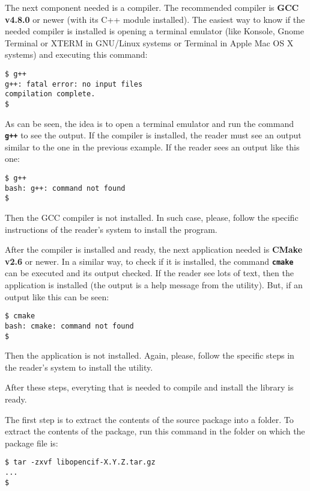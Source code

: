 \documentclass[11pt,twoside,openany,x11names,svgnames]{memoir}
\begin{document}
The next component needed is a compiler. The recommended compiler is \textbf{GCC v4.8.0} or newer (with its C++ module installed). The easiest way to know if the needed compiler is installed is opening a terminal emulator (like Konsole, Gnome Terminal or XTERM in GNU/Linux systems or Terminal in Apple Mac OS X systems) and executing this command:

\begin{lstlisting}[frame=single,style=SystemCommandStyle]
$ g++
g++: fatal error: no input files
compilation complete.
$
\end{lstlisting}

As can be seen, the idea is to open a terminal emulator and run the command \textbf{\texttt{g++}} to see the output. If the compiler is installed, the reader must see an output similar to the one in the previous example. If the reader sees an output like this one:

\begin{lstlisting}[frame=single,style=SystemCommandStyle]
$ g++
bash: g++: command not found
$
\end{lstlisting}

Then the GCC compiler is not installed. In such case, please, follow the specific instructions of the reader's system to install the program.

After the compiler is installed and ready, the next application needed is \textbf{CMake v2.6} or newer. In a similar way, to check if it is installed, the command \textbf{\texttt{cmake}} can be executed and its output checked. If the reader see lots of text, then the application is installed (the output is a help message from the utility). But, if an output like this can be seen:

\begin{lstlisting}[frame=single,style=SystemCommandStyle]
$ cmake
bash: cmake: command not found
$
\end{lstlisting}

Then the application is not installed. Again, please, follow the specific steps in the reader's system to install the utility.

After these steps, everyting that is needed to compile and install the library is ready.

The first step is to extract the contents of the source package into a folder. To extract the contents of the package, run this command in the folder on which the package file is:

\begin{lstlisting}[frame=single,style=SystemCommandStyle]
$ tar -zxvf libopencif-X.Y.Z.tar.gz
...
$
\end{lstlisting}
\end{document}
